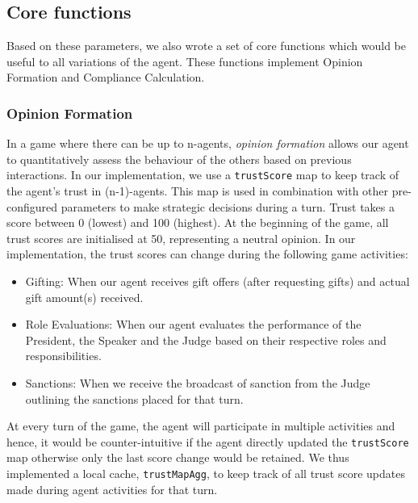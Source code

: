 \subsection{Core functions}

Based on these parameters, we also wrote a set of core functions which would be useful to all variations of the agent. These functions implement Opinion Formation and Compliance Calculation.


\subsubsection*{Opinion Formation} \label{section_opinion_formation}
In a game where there can be up to n-agents, \textit{opinion formation} allows our agent to quantitatively assess the behaviour of the others based on previous interactions. %
In our implementation, we use a \texttt{trustScore} map to keep track of the agent's trust in (n-1)-agents. This map is used in combination with other pre-configured parameters to make strategic decisions during a turn. 
Trust takes a score between 0 (lowest) and 100 (highest). At the beginning of the game, all trust scores are initialised at 50, representing a neutral opinion. In our implementation, the trust scores can change during the following game activities:

\begin{itemize}
    \item Gifting: When our agent receives gift offers (after requesting gifts) and actual gift amount(s) received.
    \item Role Evaluations: When our agent evaluates the performance of the President, the Speaker and the Judge based on their respective roles and responsibilities.
    \item Sanctions: When we receive the broadcast of sanction from the Judge outlining the sanctions placed for that turn.
\end{itemize}


At every turn of the game, the agent will participate in multiple activities and hence, it would be counter-intuitive if the agent directly updated the \texttt{trustScore} map otherwise only the last score change would be retained. We thus implemented a local cache, \texttt{trustMapAgg}, to keep track of all trust score updates made during agent activities for that turn. 

